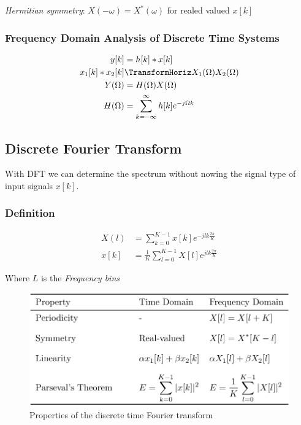 

\textit{Hermitian symmetry}: $X(-\omega)=X^*(\omega)$ for realed valued $x[k]$

\subsubsection{Frequency Domain Analysis of Discrete Time Systems}
\begin{align*}
    y[k] &= h[k]*x[k] \\
    x_1[k]*x_2[k] &\TransformHoriz  X_1(\Omega)X_2(\Omega) \\
    Y(\Omega) &= H(\Omega)X(\Omega) \\
    H(\Omega) &= \sum_{k=-\infty}^{\infty} h[k]e^{-j\Omega k}
\end{align*}


\newpage
\subsection{Discrete Fourier Transform}
With DFT we can determine the spectrum without nowing the signal type
of input signals $x[k]$.

\subsubsection{Definition}
\begin{align*}
    X(l) &= \sum_{k=0}^{K-1} x[k]e^{-jlk\frac{2\pi}{K}} \\
    x[k] &= \frac{1}{K}\sum_{l=0}^{K-1}X[l]e^{jlk\frac{2\pi}{K}}
\end{align*}

Where $L$ is the \textit{Frequency bins}

\begin{figure}[!h]
    \centering
    \includegraphics[width=12cm]{image/properties_of_the_dft.png}
    \caption{Properties of the discrete time Fourier transform}
    \label{fig:properties_of_the_dft}
\end{figure}


